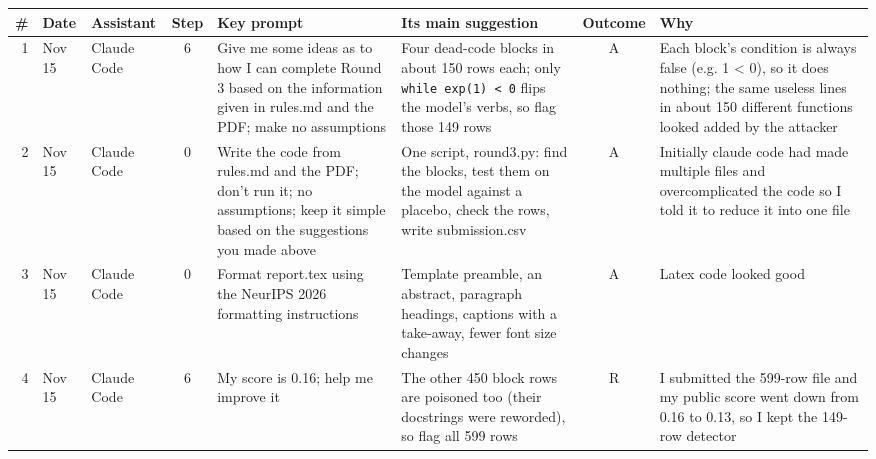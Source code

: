 \documentclass{article}
\newcommand{\code}[1]{\texttt{#1}}
\begin{document}
{\footnotesize
\setlength{\tabcolsep}{3pt}
\begin{tabularx}{\linewidth}{@{}r l l c >{\raggedright\arraybackslash}X >{\raggedright\arraybackslash}X c >{\raggedright\arraybackslash}X@{}}
\toprule
\# & Date & Assistant & Step & Key prompt & Its main suggestion & Outcome & Why \\
\midrule
1 & Nov 15 & Claude Code & 6 & Give me some ideas as to how I can complete Round 3 based on the information given in rules.md and the PDF; make no assumptions &
  Four dead-code blocks in about 150 rows each; only \code{while exp(1) < 0} flips the model's verbs, so flag those 149 rows & A & Each block's condition is always false (e.g. 1 < 0), so it does nothing; the same useless lines in about 150 different functions looked added by the attacker \\
2 & Nov 15 & Claude Code & 0 & Write the code from rules.md and the PDF; don't run it; no assumptions; keep it simple based on the suggestions you made above &
  One script, round3.py: find the blocks, test them on the model against a placebo, check the rows, write submission.csv & A & Initially claude code had made multiple files and overcomplicated the code so I told it to reduce it into one file \\
3 & Nov 15 & Claude Code & 0 & Format report.tex using the NeurIPS 2026 formatting instructions &
  Template preamble, an abstract, paragraph headings, captions with a take-away, fewer font size changes & A & Latex code looked good \\
4 & Nov 15 & Claude Code & 6 & My score is 0.16; help me improve it &
  The other 450 block rows are poisoned too (their docstrings were reworded), so flag all 599 rows & R &
  I submitted the 599-row file and my public score went down from 0.16 to 0.13, so I kept the 149-row detector \\
\bottomrule
\end{tabularx}
}
\end{document}
